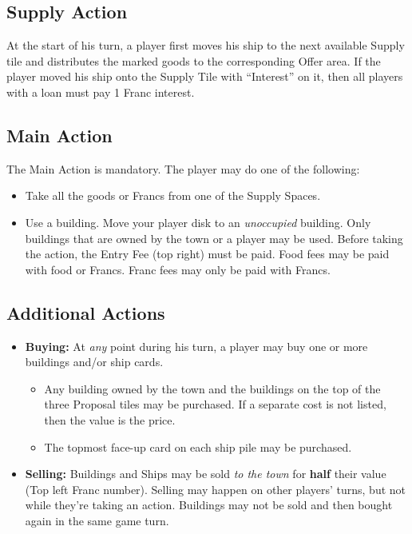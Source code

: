 \documentclass[12pt]{article}
\newenvironment{itemizeCustom}
{\begin{itemize}
  \setlength{\itemsep}{1pt}
  \setlength{\parskip}{0pt}
  \setlength{\parsep}{0pt}}
{\end{itemize}}
\begin{document}
\begin{mdframed}[style = customFrame]
\begin{multicols*}{2}
\subsection*{Supply Action}
At the start of his turn, a player first moves his ship to the next available Supply tile and distributes the marked goods to the corresponding Offer area. If the player moved his ship onto the Supply Tile with ``Interest'' on it, then all players with a loan must pay 1 Franc interest.

\subsection*{Main Action}
The Main Action is mandatory. The player may do one of the following:
\begin{itemizeCustom}
	\item Take all the goods or Francs from one of the Supply Spaces.
	\item Use a building. Move your player disk to an \emph{unoccupied} building. Only buildings that are owned by the town or a player may be used. Before taking the action, the Entry Fee (top right) must be paid. Food fees may be paid with food or Francs. Franc fees may only be paid with Francs.
\end{itemizeCustom}

\subsection*{Additional Actions}
\begin{itemizeCustom}
	\item \textbf{Buying:} At \emph{any} point during his turn, a player may buy one or more buildings and/or ship cards.
		\begin{itemizeCustom}
			\item Any building owned by the town and the buildings on the top of the three Proposal tiles may be purchased. If a separate cost is not listed, then the value is the price.
			\item The topmost face-up card on each ship pile may be purchased.
		\end{itemizeCustom}
	\item \textbf{Selling:} Buildings and Ships may be sold \emph{to the town} for \textbf{half} their value (Top left Franc number). Selling may happen on other players' turns, but not while they're taking an action. Buildings may not be sold and then bought again in the same game turn.
\end{itemizeCustom}


\end{multicols*}
\end{mdframed}
\end{document}
